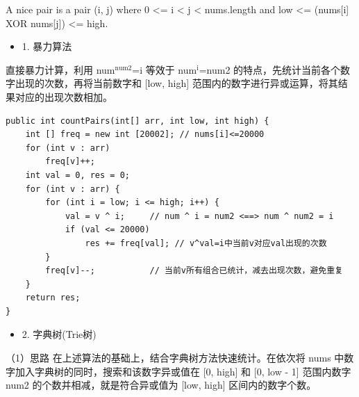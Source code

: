 \documentclass[9pt, b5paaper]{book}
\begin{document}
A nice pair is a pair (i, j) where 0 <= i < j < nums.length and low <= (nums[i] XOR nums[j]) <= high.
\begin{itemize}
\item 1. 暴力算法
\end{itemize}

直接暴力计算，利用 num$^{\text{num2}}$=i 等效于 num$^{\text{i}}$=num2 的特点，先统计当前各个数字出现的次数，再将当前数字和 [low, high] 范围内的数字进行异或运算，将其结果对应的出现次数相加。

\begin{verbatim}
public int countPairs(int[] arr, int low, int high) { 
    int [] freq = new int [20002]; // nums[i]<=20000
    for (int v : arr)
        freq[v]++;
    int val = 0, res = 0;
    for (int v : arr) {
        for (int i = low; i <= high; i++) {
            val = v ^ i;     // num ^ i = num2 <==> num ^ num2 = i
            if (val <= 20000)
                res += freq[val]; // v^val=i中当前v对应val出现的次数
        }
        freq[v]--;           // 当前v所有组合已统计，减去出现次数，避免重复
    }
    return res;
}
\end{verbatim}
\begin{itemize}
\item 2. 字典树(Trie树)
\end{itemize}
（1）思路
在上述算法的基础上，结合字典树方法快速统计。在依次将 nums 中数字加入字典树的同时，搜索和该数字异或值在 [0, high] 和 [0, low - 1] 范围内数字 num2 的个数并相减，就是符合异或值为 [low, high] 区间内的数字个数。
\end{document}

